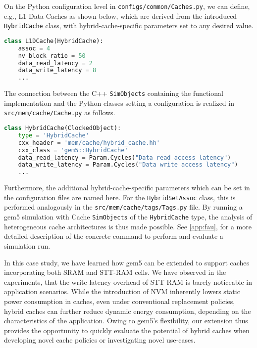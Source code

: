 On the Python configuration level in \texttt{configs/common/Caches.py}, we can define, e.g., L1 Data Caches as shown below, which are derived from the introduced \texttt{HybridCache} class, with hybrid-cache-specific parameters set to any desired value.
\begin{lstlisting}[language = Python]
class L1DCache(HybridCache):
    assoc = 4
    nv_block_ratio = 50
    data_read_latency = 2
    data_write_latency = 8
    ...
\end{lstlisting}
The connection between the C++ \texttt{SimObjects} containing the functional implementation and the Python classes setting a configuration is realized in \texttt{src/mem/cache/Cache.py} as follows.
\begin{lstlisting}[language = Python]
class HybridCache(ClockedObject):
    type = 'HybridCache'
    cxx_header = 'mem/cache/hybrid_cache.hh'
    cxx_class = 'gem5::HybridCache'
    data_read_latency = Param.Cycles("Data read access latency")
    data_write_latency = Param.Cycles("Data write access latency")
    ...
\end{lstlisting}
Furthermore, the additional hybrid-cache-specific parameters which can be set in the configuration files are named here.
For the \texttt{HybridSetAssoc} class, this is performed analogously in the \texttt{src/mem/cache/tags/Tags.py} file.
By running a gem5 simulation with Cache \texttt{SimObjects} of the \texttt{HybridCache} type, the analysis of heterogeneous cache architectures is thus made possible.
See \cref{app:fau}, for a more detailed description of the concrete command to perform and evaluate a simulation run.
\begin{insightbox}
In this case study, we have learned how gem5 can be extended to support caches incorporating both SRAM and STT-RAM cells.
We have observed in the experiments, that the write latency overhead of STT-RAM is barely noticeable in application scenarios.
While the introduction of NVM inherently lowers static power consumption in caches, even under conventional replacement policies, hybrid caches can further reduce dynamic energy consumption, depending on the characteristics of the application.
Owing to gem5's flexibility, our extension thus provides the opportunity to quickly evaluate the potential of hybrid caches when developing novel cache policies or investigating novel use-cases.

\end{insightbox}
